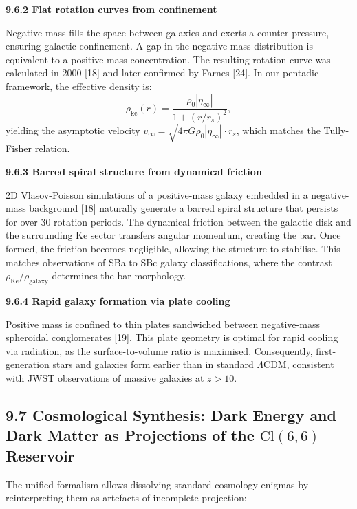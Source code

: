 \documentclass[11pt]{article}
\begin{document}
\textbf{9.6.2 Flat rotation curves from confinement}

Negative mass fills the space between galaxies and exerts a
counter-pressure, ensuring galactic confinement. A gap in the
negative-mass distribution is equivalent to a positive-mass
concentration. The resulting rotation curve was calculated in 2000
{[}18{]} and later confirmed by Farnes {[}24{]}. In our pentadic
framework, the effective density is: \[
\rho_{\text{ke}}(r) = \frac{\rho_0 |\eta_\infty|}{1 + (r/r_s)^2},
\] yielding the asymptotic velocity
\(v_\infty = \sqrt{4\pi G \rho_0 |\eta_\infty|} \cdot r_s\), which
matches the Tully-Fisher relation.

\textbf{9.6.3 Barred spiral structure from dynamical friction}

2D Vlasov-Poisson simulations of a positive-mass galaxy embedded in a
negative-mass background {[}18{]} naturally generate a barred spiral
structure that persists for over 30 rotation periods. The dynamical
friction between the galactic disk and the surrounding Ke sector
transfers angular momentum, creating the bar. Once formed, the friction
becomes negligible, allowing the structure to stabilise. This matches
observations of SBa to SBc galaxy classifications, where the contrast
\(\rho_{\text{Ke}} / \rho_{\text{galaxy}}\) determines the bar
morphology.

\textbf{9.6.4 Rapid galaxy formation via plate cooling}

Positive mass is confined to thin plates sandwiched between
negative-mass spheroidal conglomerates {[}19{]}. This plate geometry is
optimal for rapid cooling via radiation, as the surface-to-volume ratio
is maximised. Consequently, first-generation stars and galaxies form
earlier than in standard \(\Lambda\)CDM, consistent with JWST
observations of massive galaxies at \(z > 10\).

\hypertarget{cosmological-synthesis-dark-energy-and-dark-matter-as-projections-of-the-textcl66-reservoir}{%
\subsection{\texorpdfstring{9.7 Cosmological Synthesis: Dark Energy and
Dark Matter as Projections of the \(\text{Cl}(6,6)\)
Reservoir}{9.7 Cosmological Synthesis: Dark Energy and Dark Matter as Projections of the \textbackslash text\{Cl\}(6,6) Reservoir}}\label{cosmological-synthesis-dark-energy-and-dark-matter-as-projections-of-the-textcl66-reservoir}}

The unified formalism allows dissolving standard cosmology enigmas by
reinterpreting them as artefacts of incomplete projection:
\end{document}
